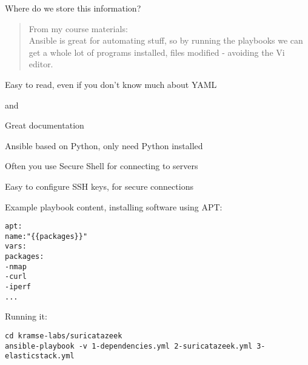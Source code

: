 \documentclass[Screen16to9,17pt]{foils}
\begin{document}
\centerline{Where do we store this information?}





\begin{quote}
From my course materials:\\
Ansible is great for automating stuff, so by running the playbooks we can get a whole lot of programs installed, files modified - avoiding the Vi editor.
\end{quote}

\begin{list2}
\item Easy to read, even if you don't know much about YAML
\item {} and 
\item Great documentation\\
\end{list2}




\begin{list2}
\item Ansible based on Python, only need Python installed\\
\item Often you use Secure Shell for connecting to servers\\
\item Easy to configure SSH keys, for secure connections
\end{list2}





Example playbook content, installing software using APT:
\begin{alltt}\small
apt:
    name: "\{\{ packages \}\}"
    vars:
      packages:
        - nmap
        - curl
        - iperf
        ...
\end{alltt}

Running it:
\begin{verbatim}
cd kramse-labs/suricatazeek
ansible-playbook -v 1-dependencies.yml 2-suricatazeek.yml 3-elasticstack.yml
\end{verbatim}
\end{document}

